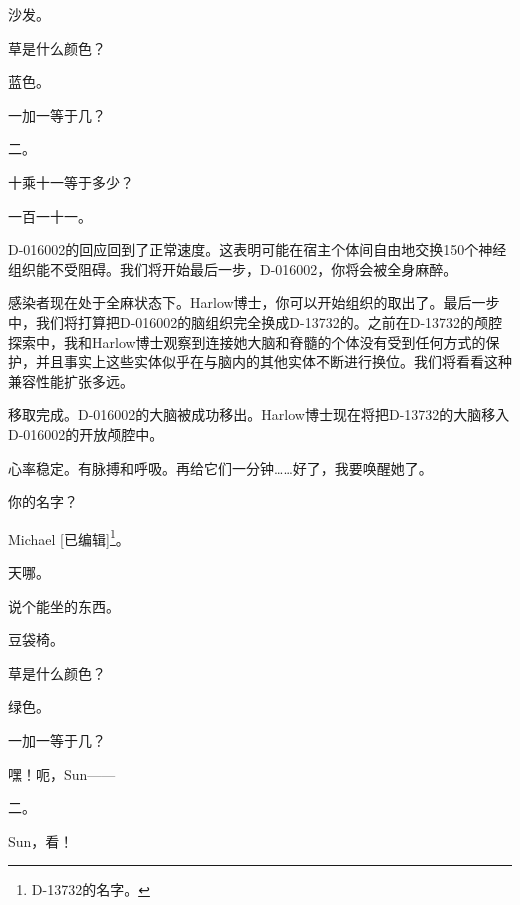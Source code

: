 \begin{scpbox}
沙发。

草是什么颜色？

蓝色。

一加一等于几？

二。

十乘十一等于多少？

一百一十一。

D-016002的回应回到了正常速度。这表明可能在宿主个体间自由地交换150个神经组织能不受阻碍。我们将开始最后一步，D-016002，你将会被全身麻醉。


感染者现在处于全麻状态下。Harlow博士，你可以开始组织的取出了。最后一步中，我们将打算把D-016002的脑组织完全换成D-13732的。之前在D-13732的颅腔探索中，我和Harlow博士观察到连接她大脑和脊髓的个体没有受到任何方式的保护，并且事实上这些实体似乎在与脑内的其他实体不断进行换位。我们将看看这种兼容性能扩张多远。


移取完成。D-016002的大脑被成功移出。Harlow博士现在将把D-13732的大脑移入D-016002的开放颅腔中。


心率稳定。有脉搏和呼吸。再给它们一分钟……好了，我要唤醒她了。


你的名字？

Michael {[}已编辑]\footnote{D-13732的名字。}。

天哪。

说个能坐的东西。

豆袋椅。

草是什么颜色？

绿色。

一加一等于几？


嘿！呃，Sun——

二。

Sun，看！



\end{scpbox}
